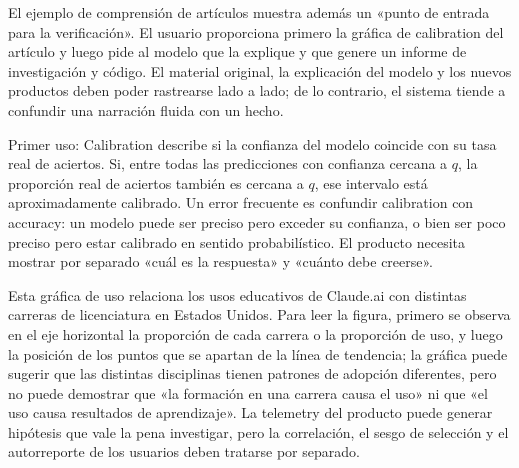
El ejemplo de comprensión de artículos muestra además un «punto de entrada para la verificación». El usuario proporciona primero la gráfica de calibration del artículo y luego pide al modelo que la explique y que genere un informe de investigación y código. El material original, la explicación del modelo y los nuevos productos deben poder rastrearse lado a lado; de lo contrario, el sistema tiende a confundir una narración fluida con un hecho.



\begin{knowledgebox}{Primer uso: Calibration}
 describe si la confianza del modelo coincide con su tasa real de aciertos. Si, entre todas las predicciones con confianza cercana a $q$, la proporción real de aciertos también es cercana a $q$, ese intervalo está aproximadamente calibrado. Un error frecuente es confundir calibration con accuracy: un modelo puede ser preciso pero exceder su confianza, o bien ser poco preciso pero estar calibrado en sentido probabilístico. El producto necesita mostrar por separado «cuál es la respuesta» y «cuánto debe creerse».
\end{knowledgebox}


Esta gráfica de uso relaciona los usos educativos de Claude.ai con distintas carreras de licenciatura en Estados Unidos. Para leer la figura, primero se observa en el eje horizontal la proporción de cada carrera o la proporción de uso, y luego la posición de los puntos que se apartan de la línea de tendencia; la gráfica puede sugerir que las distintas disciplinas tienen patrones de adopción diferentes, pero no puede demostrar que «la formación en una carrera causa el uso» ni que «el uso causa resultados de aprendizaje». La telemetry del producto puede generar hipótesis que vale la pena investigar, pero la correlación, el sesgo de selección y el autorreporte de los usuarios deben tratarse por separado.

